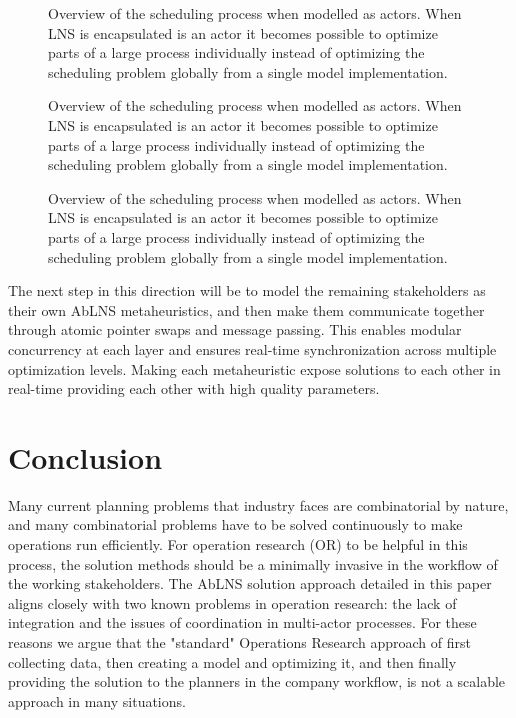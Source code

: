 \begin{figure}[H]
	\centering
	
	\resizebox{0.7\textwidth}{!}{
		\drawModelSetupHexagon[metaheuristics=true]
	}
	\caption{
		Overview of the scheduling process when modelled as actors. When LNS is encapsulated 
		is an actor it becomes possible to optimize parts of a large process individually instead of 
		optimizing the scheduling problem globally from a single model implementation.
	}
	\label{fig:ordinator-hexagon:metaheuristics}
\end{figure}

\begin{figure}[H]
	\centering
	
	\resizebox{0.7\textwidth}{!}{
		\drawModelSetupHexagon[orchestrator=true]
	}
	\caption{
		Overview of the scheduling process when modelled as actors. When LNS is encapsulated 
		is an actor it becomes possible to optimize parts of a large process individually instead of 
		optimizing the scheduling problem globally from a single model implementation.
	}
	\label{fig:ordinator-hexagon:orchestrator}
\end{figure}
\begin{figure}[H]
	\centering
	
	\resizebox{0.7\textwidth}{!}{
		\drawModelSetupHexagon[userinterface=true]
	}
	\caption{
		Overview of the scheduling process when modelled as actors. When LNS is encapsulated 
		is an actor it becomes possible to optimize parts of a large process individually instead of 
		optimizing the scheduling problem globally from a single model implementation.
	}
	\label{fig:ordinator-hexagon:userinterfaces}
\end{figure}

The next step in this direction will be to model the remaining stakeholders as their own 
AbLNS metaheuristics, and then make them communicate together through atomic pointer swaps and message
passing. This enables modular concurrency at each layer and ensures real-time
synchronization across multiple optimization levels. Making each metaheuristic expose solutions to each 
other in real-time providing each other with high quality parameters.

\section{Conclusion}
Many current planning problems that industry faces are combinatorial by nature, 
and many combinatorial problems have to be solved continuously to make operations 
run efficiently. For operation research (OR) to be helpful in this process, the solution methods 
should be a minimally invasive in the workflow of the working stakeholders. 
The AbLNS solution approach detailed in this paper aligns
closely with two known problems in operation research: the lack of integration and the issues of 
coordination in multi-actor processes. For these reasons we argue that the
"standard" Operations Research approach of first collecting data, then creating a
model and optimizing it, and then finally providing the solution to the planners
in the company workflow, is not a scalable approach in many situations.


